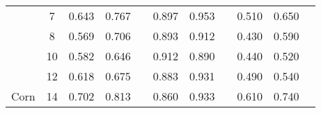 \begin{table}[]
\begin{tabular}{|c|c|l|l|l|l|l|l|l|l|l|}
                        & 7                     & \cellcolor[HTML]{EFEFEF}0.643		 & \cellcolor[HTML]{EFEFEF}0.767	  & \cellcolor[HTML]{EFEFEF}               & 0.897    & 0.953    &          & \cellcolor[HTML]{EFEFEF}0.510 & \cellcolor[HTML]{EFEFEF}0.650 & \cellcolor[HTML]{EFEFEF}      \\ \cline{2-11} 
                        & 8                     & \cellcolor[HTML]{EFEFEF}0.569          & \cellcolor[HTML]{EFEFEF}0.706	  & \cellcolor[HTML]{EFEFEF}               & 0.893    & 0.912    &          & \cellcolor[HTML]{EFEFEF}0.430 & \cellcolor[HTML]{EFEFEF}0.590 & \cellcolor[HTML]{EFEFEF}      \\ \cline{2-11} 
                        & 10                    & \cellcolor[HTML]{EFEFEF}0.582          & \cellcolor[HTML]{EFEFEF}0.646          & \cellcolor[HTML]{EFEFEF}               & 0.912    & 0.890    &          & \cellcolor[HTML]{EFEFEF}0.440 & \cellcolor[HTML]{EFEFEF}0.520 & \cellcolor[HTML]{EFEFEF}      \\ \cline{2-11} 
                        & 12                    & \cellcolor[HTML]{EFEFEF}0.618          & \cellcolor[HTML]{EFEFEF}0.675          & \cellcolor[HTML]{EFEFEF}              & 0.883    & 0.931    &          & \cellcolor[HTML]{EFEFEF}0.490 & \cellcolor[HTML]{EFEFEF}0.540 & \cellcolor[HTML]{EFEFEF}      \\ \cline{2-11} 
\multirow{-9}{*}{Corn}  & 14                    & \cellcolor[HTML]{EFEFEF}0.702          & \cellcolor[HTML]{EFEFEF}0.813          & \cellcolor[HTML]{EFEFEF}               & 0.860    & 0.933    &          & \cellcolor[HTML]{EFEFEF}0.610 & \cellcolor[HTML]{EFEFEF}0.740 & \cellcolor[HTML]{EFEFEF}      \\ \hline
\end{tabular}
\end{table}
